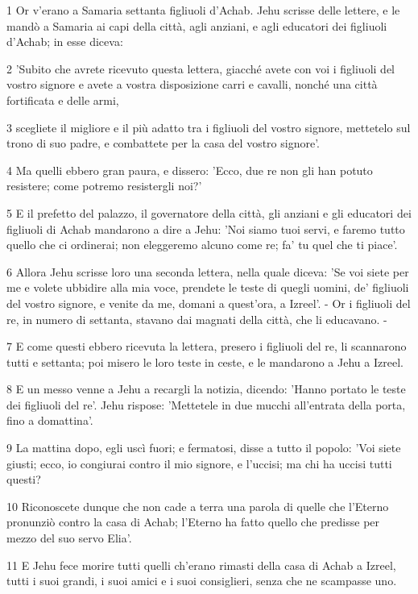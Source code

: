 \par 1 Or v'erano a Samaria settanta figliuoli d'Achab. Jehu scrisse delle lettere, e le mandò a Samaria ai capi della città, agli anziani, e agli educatori dei figliuoli d'Achab; in esse diceva:
\par 2 'Subito che avrete ricevuto questa lettera, giacché avete con voi i figliuoli del vostro signore e avete a vostra disposizione carri e cavalli, nonché una città fortificata e delle armi,
\par 3 scegliete il migliore e il più adatto tra i figliuoli del vostro signore, mettetelo sul trono di suo padre, e combattete per la casa del vostro signore'.
\par 4 Ma quelli ebbero gran paura, e dissero: 'Ecco, due re non gli han potuto resistere; come potremo resistergli noi?'
\par 5 E il prefetto del palazzo, il governatore della città, gli anziani e gli educatori dei figliuoli di Achab mandarono a dire a Jehu: 'Noi siamo tuoi servi, e faremo tutto quello che ci ordinerai; non eleggeremo alcuno come re; fa' tu quel che ti piace'.
\par 6 Allora Jehu scrisse loro una seconda lettera, nella quale diceva: 'Se voi siete per me e volete ubbidire alla mia voce, prendete le teste di quegli uomini, de' figliuoli del vostro signore, e venite da me, domani a quest'ora, a Izreel'. - Or i figliuoli del re, in numero di settanta, stavano dai magnati della città, che li educavano. -
\par 7 E come questi ebbero ricevuta la lettera, presero i figliuoli del re, li scannarono tutti e settanta; poi misero le loro teste in ceste, e le mandarono a Jehu a Izreel.
\par 8 E un messo venne a Jehu a recargli la notizia, dicendo: 'Hanno portato le teste dei figliuoli del re'. Jehu rispose: 'Mettetele in due mucchi all'entrata della porta, fino a domattina'.
\par 9 La mattina dopo, egli uscì fuori; e fermatosi, disse a tutto il popolo: 'Voi siete giusti; ecco, io congiurai contro il mio signore, e l'uccisi; ma chi ha uccisi tutti questi?
\par 10 Riconoscete dunque che non cade a terra una parola di quelle che l'Eterno pronunziò contro la casa di Achab; l'Eterno ha fatto quello che predisse per mezzo del suo servo Elia'.
\par 11 E Jehu fece morire tutti quelli ch'erano rimasti della casa di Achab a Izreel, tutti i suoi grandi, i suoi amici e i suoi consiglieri, senza che ne scampasse uno.
